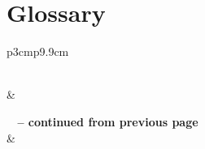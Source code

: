 \documentclass[11pt]{report}
\begin{document}
\section{Glossary}
\begin{longtable}{p{3cm}p{9.9cm}}
\caption[Glossary of Terms]{Glossary of Terms} 
\label{table:glossart} \\

\hline {} &  \\ \hline 
\endfirsthead

%
{{\bfseries \tablename\ \thetable{} -- continued from previous page}} \\
\hline {} &  \\ \hline 
\endhead

 \\ \hline
\endfoot


\end{longtable}
\end{document}
